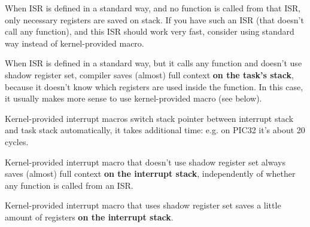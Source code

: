\begin{DoxyItemize}
\item When I\+S\+R is defined in a standard way, and no function is called from that I\+S\+R, only necessary registers are saved on stack. If you have such an I\+S\+R (that doesn't call any function), and this I\+S\+R should work very fast, consider using standard way instead of kernel-\/provided macro.
\item When I\+S\+R is defined in a standard way, but it calls any function and doesn't use shadow register set, compiler saves (almost) full context {\bfseries on the task's stack}, because it doesn't know which registers are used inside the function. In this case, it usually makes more sense to use kernel-\/provided macro (see below).
\item Kernel-\/provided interrupt macros switch stack pointer between interrupt stack and task stack automatically, it takes additional time\+: e.\+g. on P\+I\+C32 it's about 20 cycles.
\item Kernel-\/provided interrupt macro that doesn't use shadow register set always saves (almost) full context {\bfseries on the interrupt stack}, independently of whether any function is called from an I\+S\+R.
\item Kernel-\/provided interrupt macro that uses shadow register set saves a little amount of registers {\bfseries on the interrupt stack}. 
\end{DoxyItemize}
